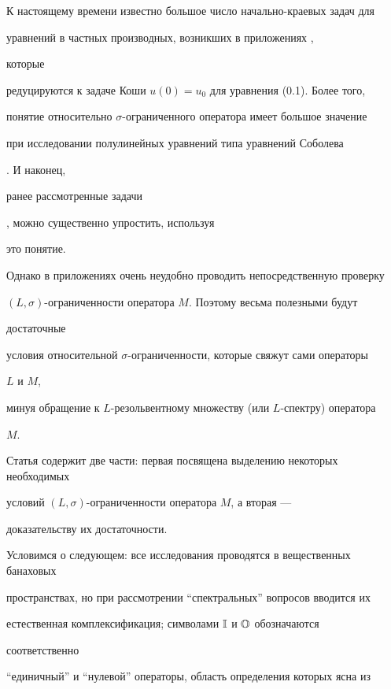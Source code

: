 К настоящему времени известно большое число начально-краевых задач для 


уравнений в частных производных, возникших в приложениях \cite{Dem}, 


которые 


редуцируются к задаче Коши $u(0)=u_0$ для уравнения (0.1). Более того, 


понятие относительно $\sigma$-ограниченного оператора имеет большое значение 


при исследовании полулинейных уравнений типа уравнений Соболева 


\cite{S8}. И наконец, 


ранее рассмотренные задачи 


\cite{S9}, \cite{S10} можно существенно упростить, используя 


это понятие. 


 


Однако в приложениях очень неудобно проводить непосредственную проверку 


$(L,\sigma)$-огра\-ни\-ченности оператора $M$. Поэтому весьма полезными будут 


достаточные 


условия относительной $\sigma$-ограниченности, которые свяжут сами операторы 


$L$ и $M$, 


минуя обращение к $L$-резольвентному множеству (или $L$-спектру) оператора 


$M$. 


 


Статья содержит две части: первая посвящена выделению некоторых необходимых 


условий $(L,\sigma)$-ограниченности оператора $M$, а вторая --- 


доказательству их достаточности. 


 


Условимся о следующем: все исследования проводятся в вещественных банаховых 


пространствах, но при рассмотрении ``спектральных'' вопросов вводится их 


естественная комплексификация; символами $\Bbb I$ и $\Bbb O$ обозначаются 


соответственно 


``единичный'' и ``нулевой'' операторы, область определения которых ясна из 



